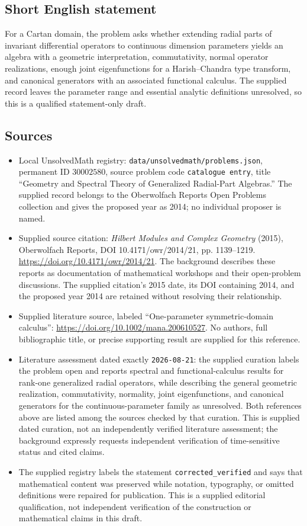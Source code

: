 \documentclass[11pt]{article}
\begin{document}
\subsection{Short English statement}
For a Cartan domain, the problem asks whether extending radial parts of invariant differential operators to continuous dimension parameters yields an algebra with a geometric interpretation, commutativity, normal operator realizations, enough joint eigenfunctions for a Harish--Chandra type transform, and canonical generators with an associated functional calculus. The supplied record leaves the parameter range and essential analytic definitions unresolved, so this is a qualified statement-only draft.
\subsection{Sources}
\begin{itemize}
\item Local UnsolvedMath registry: \texttt{data/unsolvedmath/problems.json}, permanent ID \(30002580\), source problem code \texttt{catalogue entry}, title ``Geometry and Spectral Theory of Generalized Radial-Part Algebras.'' The supplied record belongs to the Oberwolfach Reports Open Problems collection and gives the proposed year as 2014; no individual proposer is named.
\item Supplied source citation: \emph{Hilbert Modules and Complex Geometry} (2015), Oberwolfach Reports, DOI 10.4171/owr/2014/21, pp. 1139--1219. \url{https://doi.org/10.4171/owr/2014/21}. The background describes these reports as documentation of mathematical workshops and their open-problem discussions. The supplied citation's 2015 date, its DOI containing 2014, and the proposed year 2014 are retained without resolving their relationship.
\item Supplied literature source, labeled ``One-parameter symmetric-domain calculus'': \url{https://doi.org/10.1002/mana.200610527}. No authors, full bibliographic title, or precise supporting result are supplied for this reference.
\item Literature assessment dated exactly \texttt{2026-08-21}: the supplied curation labels the problem open and reports spectral and functional-calculus results for rank-one generalized radial operators, while describing the general geometric realization, commutativity, normality, joint eigenfunctions, and canonical generators for the continuous-parameter family as unresolved. Both references above are listed among the sources checked by that curation. This is supplied dated curation, not an independently verified literature assessment; the background expressly requests independent verification of time-sensitive status and cited claims.
\item The supplied registry labels the statement \texttt{corrected\_verified} and says that mathematical content was preserved while notation, typography, or omitted definitions were repaired for publication. This is a supplied editorial qualification, not independent verification of the construction or mathematical claims in this draft.
\end{itemize}
\end{document}
